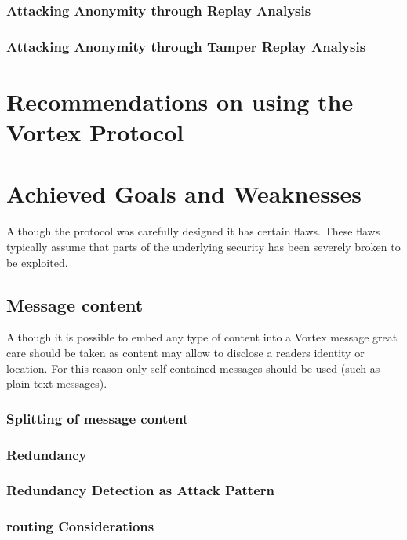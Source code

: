 \subsection{Attacking Anonymity through Replay Analysis}

\subsection{Attacking Anonymity through Tamper Replay Analysis}

\chapter{Recommendations on using the Vortex Protocol}

\chapter{Achieved Goals and Weaknesses}
Although the protocol was carefully designed it has certain flaws. These flaws typically assume that parts of the underlying security has been severely broken to be exploited.


\section{Message content}
Although it is possible to embed any type of content into a Vortex message great care should be taken as content may allow to disclose a readers identity or location. For this reason only self contained messages should be used (such as plain text messages).

\subsection{Splitting of message content}

\subsection{Redundancy}

\subsection{Redundancy Detection as Attack Pattern}

\subsection{routing Considerations}

